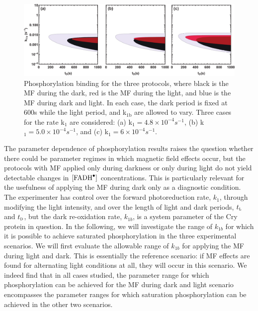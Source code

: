 \documentclass[twoside,twocolumn,9pt]{article}
\begin{document}
\begin{figure}[h]
	\centering
	\includegraphics[width = 2\columnwidth]{PhosK1bTD.pdf}
	\caption{Phosphorylation binding for the three protocols, where black is the MF during the dark, red is the MF during the
		light, and blue is the MF during dark and light. In each case, the dark period is fixed at 600s while the light period, and 
		k$_{1\text{b}}$ are allowed to vary. Three cases for the rate k$_{1}$ are considered: (a) k$_{1} = 4.8 \times 10^{-4} 
		s^{-1}$, (b) k$_{1} = 
		5.0 \times 10^{-4} s^{-1}$, and (c) k$_{1} = 6 \times 10^{-4} s^{-1}$.}
	\label{fig:PvsK1bTDark}
\end{figure}

The parameter dependence of phosphorylation results raises the question whether there could be parameter regimes in which magnetic
field effects occur, but the protocols with MF applied only during darkness or only during light do not yield detectable changes in
$[\ce{FADH^{.}}]$ concentrations. This is particularly relevant for the usefulness of applying the MF during dark only as a
diagnostic condition. The experimenter has control over the forward photoreduction rate, $k_{1}$, through modifying the light
intensity, and over the length of light and dark periods, $t_{\textsc{l}}$ and $t_{\textsc{d}}$, but the dark re-oxidation rate,
$k_{1b}$, is a system parameter of the Cry protein in question. In the following, we will investigate the range of $k_{1b}$ for
which it is possible to achieve saturated phosphorylation in the three experimental scenarios. We will first evaluate the allowable
range of $k_{1b}$ for applying the MF during light and dark. This is essentially the reference scenario: if MF effects are found for
alternating light conditions at all, they will occur in this scenario. We indeed find that in all cases studied, the parameter range
for which phosphorylation can be achieved for the MF during dark and light scenario encompasses the parameter ranges for which
saturation phosphorylation can be achieved in the other two scenarios.
\end{document}
